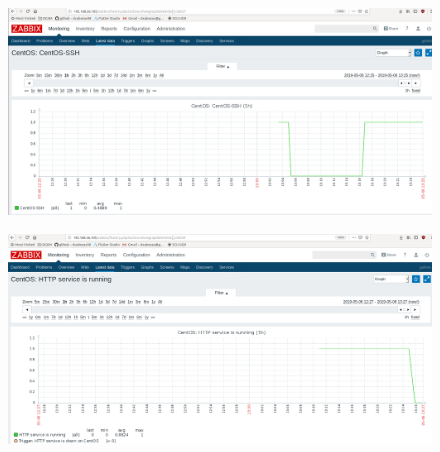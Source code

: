 \documentclass{article}
\begin{document}
\begin{figure}[H]
  \centering
  \includegraphics[width=150mm]{screenshots/graph_centos-ssh}
\end{figure}

\begin{figure}[H]
  \centering
  \includegraphics[width=150mm]{screenshots/graph_centos-http}
\end{figure}
\end{document}
